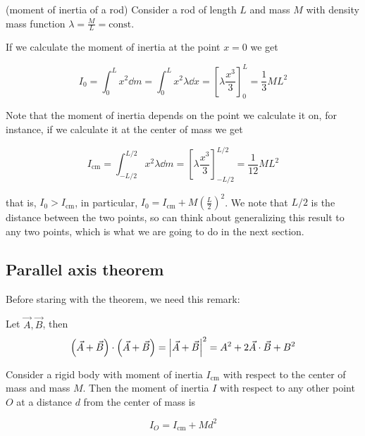 \documentclass[14pt]{extarticle}
\begin{document}
\begin{example}(moment of inertia of a rod)
    Consider a rod of length $L$ and mass $M$ with density mass function $\lambda = \frac{M}{L} = \text{const}$.

    If we calculate the moment of inertia at the point $x = 0$ we get

    \begin{equation}
        I_0 = \int_0^L x^2 \dd{m} = \int_0^L x^2 \lambda \dd{x} = \left[ \lambda \frac{x^3}{3} \right]_0^L = \frac{1}{3} ML^2
    \end{equation}

    Note that the moment of inertia depends on the point we calculate it on, for instance, if we calculate it at the center of mass we get

    \begin{equation}
        I_{\text{cm}} = \int_{-L/2}^{L/2} x^2 \lambda \dd{m} = \left[ \lambda \frac{x^3}{3} \right]_{-L/2}^{L/2} = \frac{1}{12} ML^2
    \end{equation}


    that is, $I_0 > I_{\text{cm}}$, in particular, $I_0 = I_{\text{cm}} + M \left(\frac{L}{2}\right)^2$.
    We note that $L/2$ is the distance between the two points, so can think about generalizing this result to any two points, which is what we are going to do in the next section.
\end{example}

\subsection{Parallel axis theorem}

Before staring with the theorem, we need this remark:
\begin{remark}
    Let $\vec{A}, \vec{B}$, then
    \begin{equation}
        \left( \vec{A} + \vec{B} \right) \cdot \left( \vec{A} + \vec{B} \right) = \abs{\vec{A} + \vec{B}}^2 = A^2 + 2 \vec{A} \cdot \vec{B} + B^2
    \end{equation}
\end{remark}

\begin{theorem}
    Consider a rigid body with moment of inertia $I_{\text{cm}}$ with respect to the center of mass and mass $M$. Then the moment of inertia $I$ with respect to any other point $O$ at a distance $d$ from the center of mass is

    \begin{equation}
        I_O = I_{\text{cm}} + M d^2
    \end{equation}

    \label{thm:parallel_axis}
\end{theorem}
\end{document}
